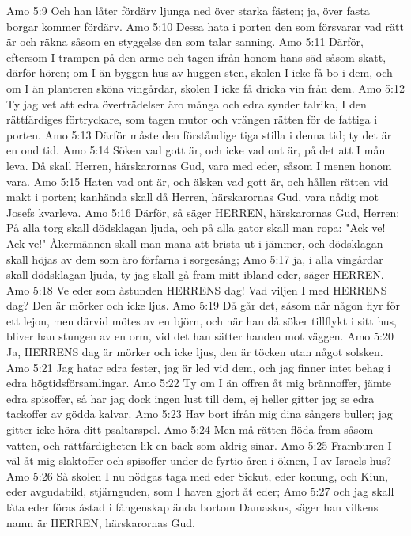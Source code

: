 Amo 5:9  Och han låter fördärv ljunga ned över starka fästen; ja, över fasta borgar kommer fördärv.
Amo 5:10  Dessa hata i porten den som försvarar vad rätt är och räkna såsom en styggelse den som talar sanning.
Amo 5:11  Därför, eftersom I trampen på den arme och tagen ifrån honom hans säd såsom skatt, därför hören; om I än byggen hus av huggen sten, skolen I icke få bo i dem, och om I än planteren sköna vingårdar, skolen I icke få dricka vin från dem.
Amo 5:12  Ty jag vet att edra överträdelser äro många och edra synder talrika, I den rättfärdiges förtryckare, som tagen mutor och vrängen rätten för de fattiga i porten.
Amo 5:13  Därför måste den förståndige tiga stilla i denna tid; ty det är en ond tid.
Amo 5:14  Söken vad gott är, och icke vad ont är, på det att I mån leva. Då skall Herren, härskarornas Gud, vara med eder, såsom I menen honom vara.
Amo 5:15  Haten vad ont är, och älsken vad gott är, och hållen rätten vid makt i porten; kanhända skall då Herren, härskarornas Gud, vara nådig mot Josefs kvarleva.
Amo 5:16  Därför, så säger HERREN, härskarornas Gud, Herren: På alla torg skall dödsklagan ljuda, och på alla gator skall man ropa: "Ack ve! Ack ve!" Åkermännen skall man mana att brista ut i jämmer, och dödsklagan skall höjas av dem som äro förfarna i sorgesång;
Amo 5:17  ja, i alla vingårdar skall dödsklagan ljuda, ty jag skall gå fram mitt ibland eder, säger HERREN.
Amo 5:18  Ve eder som åstunden HERRENS dag! Vad viljen I med HERRENS dag? Den är mörker och icke ljus.
Amo 5:19  Då går det, såsom när någon flyr för ett lejon, men därvid mötes av en björn, och när han då söker tillflykt i sitt hus, bliver han stungen av en orm, vid det han sätter handen mot väggen.
Amo 5:20  Ja, HERRENS dag är mörker och icke ljus, den är töcken utan något solsken.
Amo 5:21  Jag hatar edra fester, jag är led vid dem, och jag finner intet behag i edra högtidsförsamlingar.
Amo 5:22  Ty om I än offren åt mig brännoffer, jämte edra spisoffer, så har jag dock ingen lust till dem, ej heller gitter jag se edra tackoffer av gödda kalvar.
Amo 5:23  Hav bort ifrån mig dina sångers buller; jag gitter icke höra ditt psaltarspel.
Amo 5:24  Men må rätten flöda fram såsom vatten, och rättfärdigheten lik en bäck som aldrig sinar.
Amo 5:25  Framburen I väl åt mig slaktoffer och spisoffer under de fyrtio åren i öknen, I av Israels hus?
Amo 5:26  Så skolen I nu nödgas taga med eder Sickut, eder konung, och Kiun, eder avgudabild, stjärnguden, som I haven gjort åt eder;
Amo 5:27  och jag skall låta eder föras åstad i fångenskap ända bortom Damaskus, säger han vilkens namn är HERREN, härskarornas Gud.
